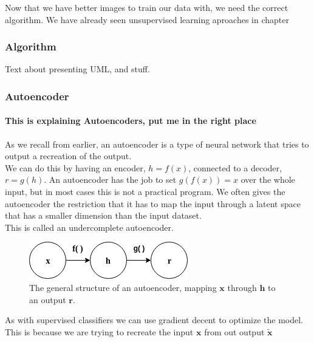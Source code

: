     Now that we have better images to train our data with, we need the correct algorithm.
    We have already seen unsupervised learning aproaches in chapter %
    \newpage
    \subsubsection{Algorithm}
      Text about presenting UML, and stuff.
      \subsubsection{Autoencoder}
	\paragraph{This is explaining Autoencoders, put me in the right place}\label{Explaining_autoencoders} %
	  As we recall from earlier, an autoencoder is a type of neural network that tries to output a recreation of the output. \\ 
	  We can do this by having an encoder, $h=f(x)$, connected to a decoder, $r=g(h)$. 
	  An autoencoder has the job to set $g(f(x))=x$ over the whole input, but in most cases this is not a practical program. We often gives the autoencoder the restriction
	  that it has to map the input through a latent space that has a smaller dimension than the input dataset.\\
	  This is called an undercomplete autoencoder.\\
	  \vspace{10px}
	  \begin{figure}[ht!]
	    \centering
	    \includegraphics[scale=0.5]{background/figures/SimpleAE.png}
	    \caption{The general structure of an autoencoder, mapping $\textbf{x}$ through $\textbf{h}$ to an output $\textbf{r}$.}
	  \end{figure}
	  
	  As with supervised classifiers we can use gradient decent to optimize the model. This is because we are trying to recreate the input $\textbf{x}$ from out output $\widetilde{\textbf{x}}$\\
	  
